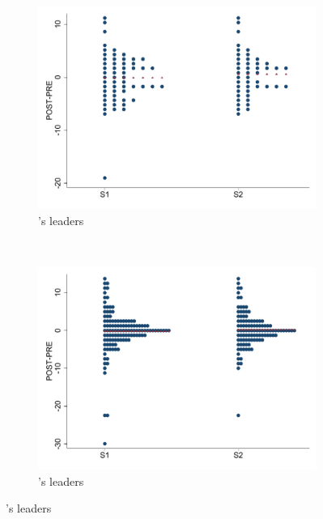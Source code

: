 \begin{figure}[h]
    \centering
    \begin{subfigure}[b]{0.45\textwidth}
        \includegraphics[width=\textwidth]{Figures/JO_distribution.pdf}
        \caption{\cite{jones2004leaders}'s leaders}
        \label{fig:JO}
    \end{subfigure}
    \\ %
    \begin{subfigure}[b]{0.45\textwidth}
        \includegraphics[width=\textwidth]{Figures/Besley_distribution.pdf}
        \caption{\cite{besley2011educated}'s leaders}
        \label{fig:Besley}
    \end{subfigure}

\end{figure}

